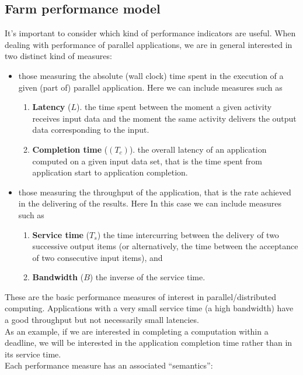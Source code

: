 \subsection{Farm performance model}
\label{subs:farmperfmodel}
	It's important to consider which kind of performance indicators are useful. When dealing with performance of parallel applications, we are in general interested in two distinct kind of measures:
	\begin{itemize}
		\item those measuring the absolute (wall clock) time spent in the execution of a given (part of) parallel application. Here we can include measures such as
		\begin{enumerate}
			\item \textbf{Latency} (\(L\)). the time spent between the moment a given activity receives input data and
			the moment the same activity delivers the output data corresponding to the input.
			\item \textbf{Completion time} (\((T_c)\)). the overall latency of an application computed on a given input
			data set, that is the time spent from application start to application completion.
		\end{enumerate}
		\item those measuring the throughput of the application, that is the rate achieved in the delivering of the results. Here In this case we can include measures such as
		\begin{enumerate}
			\item \textbf{Service time} (\(T_s\)) the time intercurring between the delivery of two successive output 			items (or alternatively, the time between the acceptance of two consecutive input items), and
			\item \textbf{Bandwidth} (\(B\)) the inverse of the service time.
		\end{enumerate}
	\end{itemize}
	These are the basic performance measures of interest in parallel/distributed computing.
	Applications with a very small service time (a high bandwidth) have a good throughput but not necessarily small latencies.\\
	As an example, if we are interested in completing a computation within a deadline, we will be interested in the application completion time rather than in its service time.\\
	Each performance measure has an associated “semantics”:
